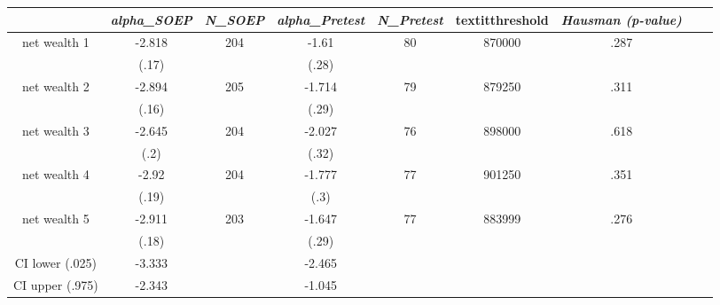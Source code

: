 \begin{tabular}{ccccccccc}
\hline \textit{}&   \textit{alpha\_SOEP}&   \textit{N\_SOEP}&       \textit{alpha\_Pretest}&        \textit{N\_Pretest}&    textit{threshold}&      \textit{Hausman (p-value)}\\ \hline
net wealth 1&-2.818&204&-1.61&80&870000&.287\\
&(.17)&&(.28)&&&\\
net wealth 2&-2.894&205&-1.714&79&879250&.311\\
&(.16)&&(.29)&&&\\
net wealth 3&-2.645&204&-2.027&76&898000&.618\\
&(.2)&&(.32)&&&\\
net wealth 4&-2.92&204&-1.777&77&901250&.351\\
&(.19)&&(.3)&&&\\
net wealth 5&-2.911&203&-1.647&77&883999&.276\\
&(.18)&&(.29)&&&\\
CI lower (.025)&-3.333&&-2.465&&&\\
CI upper (.975)&-2.343&&-1.045&&&\\
\hline \end{tabular}
